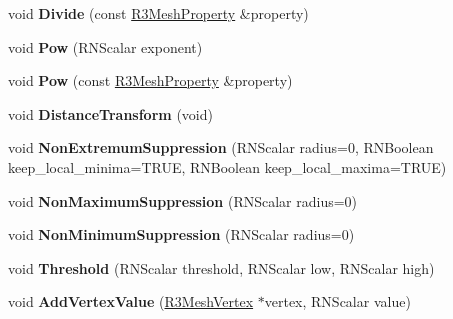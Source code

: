 \begin{DoxyCompactItemize}
\item 
void {\bfseries Divide} (const \hyperlink{struct_r3_mesh_property}{R3\+Mesh\+Property} \&property)\hypertarget{struct_r3_mesh_property_ad3b354e4d9d1789497768e37baa86176}{}\label{struct_r3_mesh_property_ad3b354e4d9d1789497768e37baa86176}

\item 
void {\bfseries Pow} (R\+N\+Scalar exponent)\hypertarget{struct_r3_mesh_property_a8e60ba1ed65da977413a61a928c64b42}{}\label{struct_r3_mesh_property_a8e60ba1ed65da977413a61a928c64b42}

\item 
void {\bfseries Pow} (const \hyperlink{struct_r3_mesh_property}{R3\+Mesh\+Property} \&property)\hypertarget{struct_r3_mesh_property_a54db47f82a36a0de93922c3e3ac67772}{}\label{struct_r3_mesh_property_a54db47f82a36a0de93922c3e3ac67772}

\item 
void {\bfseries Distance\+Transform} (void)\hypertarget{struct_r3_mesh_property_ae1348f075c7f7bb0d77b91cedc092a74}{}\label{struct_r3_mesh_property_ae1348f075c7f7bb0d77b91cedc092a74}

\item 
void {\bfseries Non\+Extremum\+Suppression} (R\+N\+Scalar radius=0, R\+N\+Boolean keep\+\_\+local\+\_\+minima=T\+R\+UE, R\+N\+Boolean keep\+\_\+local\+\_\+maxima=T\+R\+UE)\hypertarget{struct_r3_mesh_property_aa181e8e072d5b6210ac7ec52bbefffa9}{}\label{struct_r3_mesh_property_aa181e8e072d5b6210ac7ec52bbefffa9}

\item 
void {\bfseries Non\+Maximum\+Suppression} (R\+N\+Scalar radius=0)\hypertarget{struct_r3_mesh_property_a89b8491aeb21de6bcb92a84c4e9dfb5a}{}\label{struct_r3_mesh_property_a89b8491aeb21de6bcb92a84c4e9dfb5a}

\item 
void {\bfseries Non\+Minimum\+Suppression} (R\+N\+Scalar radius=0)\hypertarget{struct_r3_mesh_property_abc0fbb2ce951d93111dae2be2e037758}{}\label{struct_r3_mesh_property_abc0fbb2ce951d93111dae2be2e037758}

\item 
void {\bfseries Threshold} (R\+N\+Scalar threshold, R\+N\+Scalar low, R\+N\+Scalar high)\hypertarget{struct_r3_mesh_property_a8a7c81c2630f8eef75a9b34ef37e8410}{}\label{struct_r3_mesh_property_a8a7c81c2630f8eef75a9b34ef37e8410}

\item 
void {\bfseries Add\+Vertex\+Value} (\hyperlink{class_r3_mesh_vertex}{R3\+Mesh\+Vertex} $\ast$vertex, R\+N\+Scalar value)\hypertarget{struct_r3_mesh_property_a6d622d347cfebd68895a27f567b22c16}{}\label{struct_r3_mesh_property_a6d622d347cfebd68895a27f567b22c16}


\end{DoxyCompactItemize}
